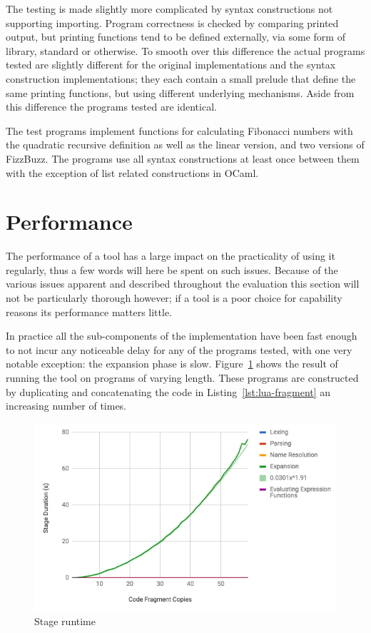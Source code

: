 \documentclass{kththesis}
\begin{document}
The testing is made slightly more complicated by syntax constructions not supporting importing. Program correctness is checked by comparing printed output, but printing functions tend to be defined externally, via some form of library, standard or otherwise. To smooth over this difference the actual programs tested are slightly different for the original implementations and the syntax construction implementations; they each contain a small prelude that define the same printing functions, but using different underlying mechanisms. Aside from this difference the programs tested are identical.

The test programs implement functions for calculating Fibonacci numbers with the quadratic recursive definition as well as the linear version, and two versions of FizzBuzz. The programs use all syntax constructions at least once between them with the exception of list related constructions in OCaml.

\section{Performance} \label{sec:performance}

The performance of a tool has a large impact on the practicality of using it regularly, thus a few words will here be spent on such issues. Because of the various issues apparent and described throughout the evaluation this section will not be particularly thorough however; if a tool is a poor choice for capability reasons its performance matters little.

In practice all the sub-components of the implementation have been fast enough to not incur any noticeable delay for any of the programs tested, with one very notable exception: the expansion phase is slow. Figure~\ref{fig:performance-graph-with-expansion} shows the result of running the tool on programs of varying length. These programs are constructed by duplicating and concatenating the code in Listing~\ref{lst:lua-fragment} an increasing number of times.

\begin{figure}[h]
\includegraphics[width=\textwidth]{resources/performance-graph-with-expansion}
\caption{Stage runtime}
\label{fig:performance-graph-with-expansion}
\end{figure}
\end{document}
